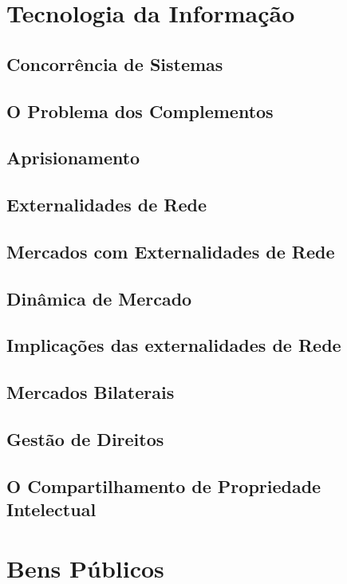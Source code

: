 \documentclass[a4paper,11pt,oneside]{book}
\theoremstyle{definition}
\theoremstyle{break}
\begin{document}
\chapter{Tecnologia da Informação}

\section{Concorrência de Sistemas}
\section{O Problema dos Complementos}
\section{Aprisionamento}
\section{Externalidades de Rede}
\section{Mercados com Externalidades de Rede}
\section{Dinâmica de Mercado}
\section{Implicações das externalidades de Rede}
\section{Mercados Bilaterais}
\section{Gestão de Direitos}
\section{O Compartilhamento de Propriedade Intelectual}

\chapter{Bens Públicos}
\end{document}
